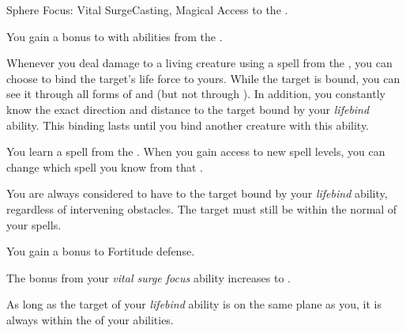     \begin{feat}{Sphere Focus: Vital Surge}{Casting, Magical}
        \featpre Access to the  .

         You gain a  bonus to  with abilities from the  .

         Whenever you deal damage to a living creature using a spell from the  , you can choose to bind the target's life force to yours.
        While the target is bound, you can see it through all forms of  and  (but not through ).
        In addition, you constantly know the exact direction and distance to the target bound by your \textit{lifebind} ability.
        This binding lasts until you bind another creature with this ability.

         You learn a spell from the  .
        When you gain access to new spell levels, you can change which spell you know from that .

         You are always considered to have  to the target bound by your \textit{lifebind} ability, regardless of intervening obstacles.
        The target must still be within the normal  of your spells.

         You gain a  bonus to Fortitude defense.

         The bonus from your \textit{vital surge focus} ability increases to .

         As long as the target of your \textit{lifebind} ability is on the same plane as you, it is always within the  of your  abilities.
    \end{feat}

